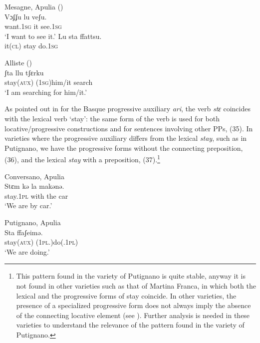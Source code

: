 \documentclass[output=paper]{langsci/langscibook}
\begin{document}
\ea%
    \label{ex:lorusso:33}
    \ea  Mesagne, Apulia (\citealt{Manzini2005})\\
    \gll Vɔʄʄu     lu  veʃu.      \\
         want.\textsc{1sg} it   see.\textsc{1sg}\\
    \glt ‘I want to see it.’ 
    \ex 
    \gll Lu   sta   ffattsu.\\
         it\textsc{(cl)}  stay  do.\textsc{1sg}\\
    \z
\z

\ea%
         Alliste (\citealt{Manzini2005})\label{ex:lorusso:34}\\
    \gll ʃta     llu     tʃɛrku    \\
         stay\textsc{(aux)} (\textsc{1sg})him/it  search\\
    \glt ‘I am searching for him/it.’ 
\z

As pointed out in \citet{Laka2006} for the Basque progressive auxiliary \textit{ari}, the verb \textit{stɛ} coincides with the lexical verb ‘stay’: the same form of the verb is used for both locative/progressive constructions and for sentences involving other PPs, (35). In varieties where the progressive auxiliary differs from the lexical \textit{stay}, such as in Putignano, we have the progressive forms without the connecting preposition, (36), and the lexical \textit{stay} with a preposition, (37).\footnote{This pattern found in the variety of Putignano is quite stable, anyway it is not found in other varieties such as that of Martina Franca, in which both the lexical and the progressive forms of stay coincide. In other varieties, the presence of a specialized progressive form does not always imply the absence of the connecting locative element (see \citealt{Manzini2017}). Further analysis is needed in these varieties to understand the relevance of the pattern found in the variety of Putignano.}

\ea%
         Conversano, Apulia\label{ex:lorusso:35}\\
    \gll Stɛm     kə  la   makənə.       \\
         stay.\textsc{1pl} with   the  car \\
    \glt ‘We are by car.’
\z

\ea%
         Putignano, Apulia\label{ex:lorusso:36}\\
    \gll Sta     ffaʃeimə.\\
         stay\textsc{(aux)}   (\textsc{1pl.})do(.\textsc{1pl})        \\
    \glt ‘We are doing.’
    \z
\end{document}
